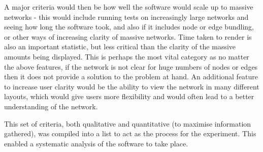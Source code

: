 \documentclass[../dissertation.tex]{subfiles}
\begin{document}
A major criteria would then be how well the software would scale up to massive networks - this would include running tests on increasingly large networks and seeing how long the software took, and also if it includes node or edge bundling, or other ways of increasing clarity of massive networks. Time taken to render is also an important statistic, but less critical than the clarity of the massive amounts being displayed. This is perhaps the most vital category as no matter the above features, if the network is not clear for huge numbers of nodes or edges then it does not provide a solution to the problem at hand. An additional feature to increase user clarity would be the ability to view the network in many different layouts, which would give users more flexibility and would often lead to a better understanding of the network. 

This set of criteria, both qualitative and quantitative (to maximise information gathered), was compiled into a list to act as the process for the experiment. This enabled a systematic analysis of the software to take place.
\end{document}
